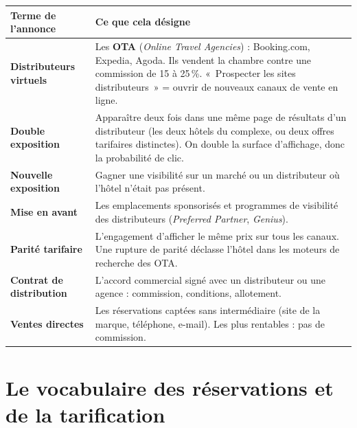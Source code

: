 \documentclass[11pt,a4paper]{article}
\newcommand{\terme}[1]{\textcolor{bleusof}{\textbf{#1}}}
\begin{document}
\begin{center}
\small\renewcommand{\arraystretch}{1.1}
\begin{tabularx}{\textwidth}{@{}L{3.5cm} X@{}}
\toprule
{}\textbf{Terme de l'annonce} & \textbf{Ce que cela désigne} \\
\midrule
\terme{Distributeurs virtuels} & Les \terme{OTA} (\emph{Online Travel Agencies}) : Booking.com, Expedia, Agoda. Ils vendent la chambre contre une commission de 15 à 25\,\%. «~Prospecter les sites distributeurs~» = ouvrir de nouveaux canaux de vente en ligne. \\
\terme{Double exposition} & Apparaître deux fois dans une même page de résultats d'un distributeur (les deux hôtels du complexe, ou deux offres tarifaires distinctes). On double la surface d'affichage, donc la probabilité de clic. \\
\terme{Nouvelle exposition} & Gagner une visibilité sur un marché ou un distributeur où l'hôtel n'était pas présent. \\
\terme{Mise en avant} & Les emplacements sponsorisés et programmes de visibilité des distributeurs (\emph{Preferred Partner}, \emph{Genius}). \\
\terme{Parité tarifaire} & L'engagement d'afficher le même prix sur tous les canaux. Une rupture de parité déclasse l'hôtel dans les moteurs de recherche des OTA. \\
\terme{Contrat de distribution} & L'accord commercial signé avec un distributeur ou une agence : commission, conditions, allotement. \\
\terme{Ventes directes} & Les réservations captées sans intermédiaire (site de la marque, téléphone, e-mail). Les plus rentables : pas de commission. \\
\bottomrule
\end{tabularx}
\end{center}

\section{Le vocabulaire des réservations et de la tarification}
\end{document}
